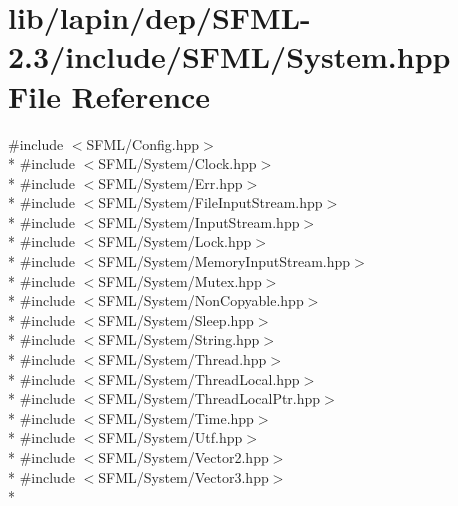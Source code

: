 \hypertarget{lapin_2dep_2_s_f_m_l-2_83_2include_2_s_f_m_l_2_system_8hpp}{\section{lib/lapin/dep/\-S\-F\-M\-L-\/2.3/include/\-S\-F\-M\-L/\-System.hpp File Reference}
\label{lapin_2dep_2_s_f_m_l-2_83_2include_2_s_f_m_l_2_system_8hpp}
}
{\ttfamily \#include $<$S\-F\-M\-L/\-Config.\-hpp$>$}\\*
{\ttfamily \#include $<$S\-F\-M\-L/\-System/\-Clock.\-hpp$>$}\\*
{\ttfamily \#include $<$S\-F\-M\-L/\-System/\-Err.\-hpp$>$}\\*
{\ttfamily \#include $<$S\-F\-M\-L/\-System/\-File\-Input\-Stream.\-hpp$>$}\\*
{\ttfamily \#include $<$S\-F\-M\-L/\-System/\-Input\-Stream.\-hpp$>$}\\*
{\ttfamily \#include $<$S\-F\-M\-L/\-System/\-Lock.\-hpp$>$}\\*
{\ttfamily \#include $<$S\-F\-M\-L/\-System/\-Memory\-Input\-Stream.\-hpp$>$}\\*
{\ttfamily \#include $<$S\-F\-M\-L/\-System/\-Mutex.\-hpp$>$}\\*
{\ttfamily \#include $<$S\-F\-M\-L/\-System/\-Non\-Copyable.\-hpp$>$}\\*
{\ttfamily \#include $<$S\-F\-M\-L/\-System/\-Sleep.\-hpp$>$}\\*
{\ttfamily \#include $<$S\-F\-M\-L/\-System/\-String.\-hpp$>$}\\*
{\ttfamily \#include $<$S\-F\-M\-L/\-System/\-Thread.\-hpp$>$}\\*
{\ttfamily \#include $<$S\-F\-M\-L/\-System/\-Thread\-Local.\-hpp$>$}\\*
{\ttfamily \#include $<$S\-F\-M\-L/\-System/\-Thread\-Local\-Ptr.\-hpp$>$}\\*
{\ttfamily \#include $<$S\-F\-M\-L/\-System/\-Time.\-hpp$>$}\\*
{\ttfamily \#include $<$S\-F\-M\-L/\-System/\-Utf.\-hpp$>$}\\*
{\ttfamily \#include $<$S\-F\-M\-L/\-System/\-Vector2.\-hpp$>$}\\*
{\ttfamily \#include $<$S\-F\-M\-L/\-System/\-Vector3.\-hpp$>$}\\*
